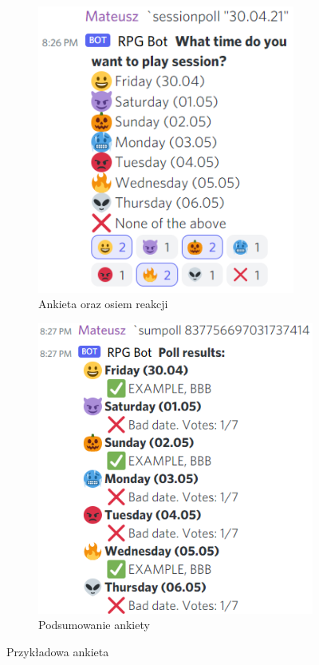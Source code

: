 \documentclass[shortabstract,inz]{iithesis}
\begin{document}
			\begin{figure}[h!]
				\centering
				\begin{subfigure}[b]{.49\textwidth}
					\centering
					\includegraphics[width=0.93\textwidth]{poll_content}
					\caption{Ankieta oraz osiem reakcji}
				\end{subfigure}
				\hfill
				\begin{subfigure}[b]{.49\textwidth}
					\centering
					\includegraphics[width=1\textwidth]{poll_results}
					\caption{Podsumowanie ankiety}
				\end{subfigure}
				\caption{Przykładowa ankieta}
				\label{sessionPoll}
			\end{figure}
	
\end{document}
